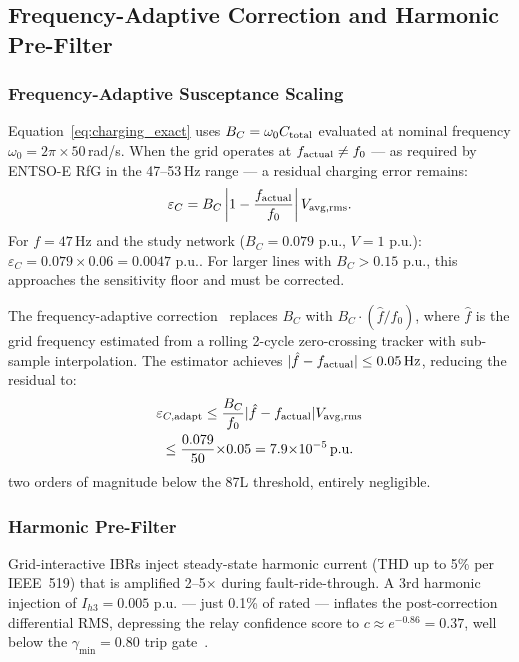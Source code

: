 \documentclass[journal,twoside,10pt]{IEEEtran}
\newcommand{\pu}{\,\text{p.u.}}
\begin{document}
\subsection{Frequency-Adaptive Correction and Harmonic Pre-Filter}
\label{sec:harmonic}

\subsubsection{Frequency-Adaptive Susceptance Scaling}

Equation~\eqref{eq:charging_exact} uses $B_C = \omega_0 C_{\rm total}$
evaluated at nominal frequency $\omega_0 = 2\pi \times 50\,$rad/s.
When the grid operates at $f_{\rm actual} \neq f_0$ --- as required by
ENTSO-E RfG in the 47--53\,Hz range --- a residual charging error remains:
\begin{equation}
  \varepsilon_C = B_C \left|1 - \frac{f_{\rm actual}}{f_0}\right| V_{\rm avg,rms}.
  \label{eq:freq_error}
\end{equation}
For $f = 47\,\text{Hz}$ and the study network ($B_C = 0.079\,\pu$,
$V = 1\,\pu$): $\varepsilon_C = 0.079 \times 0.06 = 0.0047\,\pu$.
For larger lines with $B_C > 0.15\,\pu$, this approaches the sensitivity
floor and must be corrected.

The frequency-adaptive correction~\cite{SAMBP_TR20} replaces $B_C$ with
$B_C \cdot (\hat{f}/f_0)$, where $\hat{f}$ is the grid frequency estimated
from a rolling 2-cycle zero-crossing tracker with sub-sample interpolation.
The estimator achieves $|\hat{f} - f_{\rm actual}| \leq 0.05\,\text{Hz}$,
reducing the residual to:
\begin{multline}
  \varepsilon_{C,\rm adapt}
    \leq \frac{B_C}{f_0}|\hat{f} - f_{\rm actual}|V_{\rm avg,rms} \\
    \leq \frac{0.079}{50}{\times}0.05 = 7.9{\times}10^{-5}\pu
  \label{eq:adapt_residual}
\end{multline}
two orders of magnitude below the 87L threshold, entirely negligible.

\subsubsection{Harmonic Pre-Filter}
\label{sec:harmonic_filter}

Grid-interactive IBRs inject steady-state harmonic current (THD up to 5\%
per IEEE~519) that is amplified 2--5$\times$ during fault-ride-through.
A 3rd harmonic injection of $I_{h3} = 0.005\,\pu$ --- just 0.1\% of rated
--- inflates the post-correction differential RMS, depressing the relay
confidence score to $c \approx e^{-0.86} = 0.37$, well below the
$\gamma_{\min} = 0.80$ trip gate~\cite{SAMBP_TR21}.
\end{document}
